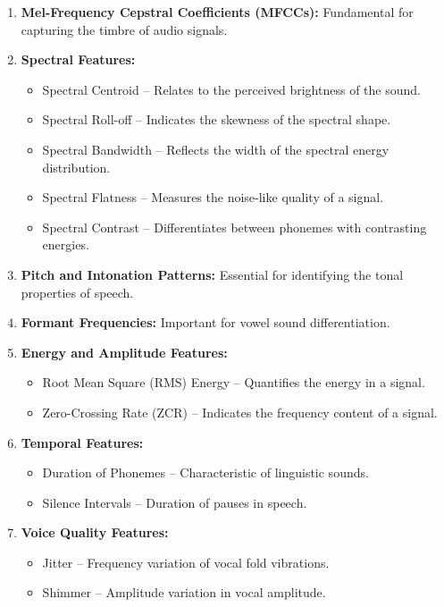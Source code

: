 \documentclass{article}
\begin{document}
\begin{enumerate}[label=\arabic*.]
    \item \textbf{Mel-Frequency Cepstral Coefficients (MFCCs):} Fundamental for capturing the timbre of audio signals.
    
    \item \textbf{Spectral Features:}
    \begin{itemize}
        \item Spectral Centroid -- Relates to the perceived brightness of the sound.
        \item Spectral Roll-off -- Indicates the skewness of the spectral shape.
        \item Spectral Bandwidth -- Reflects the width of the spectral energy distribution.
        \item Spectral Flatness -- Measures the noise-like quality of a signal.
        \item Spectral Contrast -- Differentiates between phonemes with contrasting energies.
    \end{itemize}
    
    \item \textbf{Pitch and Intonation Patterns:} Essential for identifying the tonal properties of speech.
    
    \item \textbf{Formant Frequencies:} Important for vowel sound differentiation.
    
    \item \textbf{Energy and Amplitude Features:}
    \begin{itemize}
        \item Root Mean Square (RMS) Energy -- Quantifies the energy in a signal.
        \item Zero-Crossing Rate (ZCR) -- Indicates the frequency content of a signal.
    \end{itemize}
    
    \item \textbf{Temporal Features:}
    \begin{itemize}
        \item Duration of Phonemes -- Characteristic of linguistic sounds.
        \item Silence Intervals -- Duration of pauses in speech.
    \end{itemize}
    
    \item \textbf{Voice Quality Features:}
    \begin{itemize}
        \item Jitter -- Frequency variation of vocal fold vibrations.
        \item Shimmer -- Amplitude variation in vocal amplitude.
    \end{itemize}
    

\end{enumerate}
\end{document}
